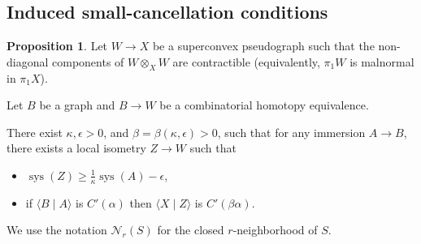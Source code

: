 \documentclass[12pt,oneside]{amsart}
\theoremstyle{definition}
\newtheorem{prop}[thm]{Proposition}
\theoremstyle{definition}
\theoremstyle{remark}
\newcommand{\neb}{\mathcal N}
\DeclareMathOperator{\sys}{\mathrm sys}
\begin{document}
\subsection{Induced small-cancellation conditions}\label{sec: induced small-cancellation}

\begin{prop}\label{prop:small-cancellation_correspondence}
Let $W\to X$ be a superconvex pseudograph such that the non-diagonal components of $W \otimes_X W$ are contractible (equivalently, $\pi_1W$ is malnormal in $\pi_1X$).


Let $B$ be a graph and  $B\rightarrow W$ be a combinatorial homotopy equivalence.

There exist $\kappa, \epsilon>0$, and $\beta = \beta(\kappa, \epsilon)>0$, such that for any immersion
$A\rightarrow B$, there exists a local isometry $Z\rightarrow W $ such that 
\begin{itemize}
    \item $\sys(Z)\geq \frac 1 \kappa \sys(A)-\epsilon$,
    \item if $\langle B \mid A \rangle$ is $C'(\alpha)$ then
$\langle X\mid Z\rangle$ is $C'(\beta\alpha)$.
\end{itemize}
\end{prop}

We use the notation $\neb_r(S)$ for the closed $r$-neighborhood of $S$.
\end{document}
